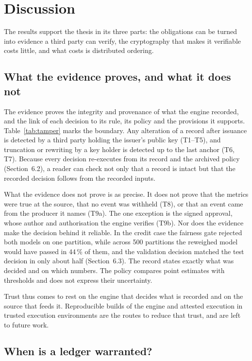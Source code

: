 \section{Discussion}
\label{sec:discussion}

The results support the thesis in its three parts: the obligations can be turned into evidence a third party can verify, the cryptography that makes it verifiable costs little, and what costs is distributed ordering.

\subsection{What the evidence proves, and what it does not}
\label{sec:disc-proves}

The evidence proves the integrity and provenance of what the engine recorded, and the link of each decision to its rule, its policy and the provisions it supports. Table~\ref{tab:tamper} marks the boundary. Any alteration of a record after issuance is detected by a third party holding the issuer's public key (T1--T5), and truncation or rewriting by a key holder is detected up to the last anchor (T6, T7). Because every decision re-executes from its record and the archived policy (Section~6.2), a reader can check not only that a record is intact but that the recorded decision follows from the recorded inputs.

What the evidence does not prove is as precise. It does not prove that the metrics were true at the source, that no event was withheld (T8), or that an event came from the producer it names (T9a). The one exception is the signed approval, whose author and authorisation the engine verifies (T9b). Nor does the evidence make the decision behind it reliable. In the credit case the fairness gate rejected both models on one partition, while across 500 partitions the reweighed model would have passed in 44\,\% of them, and the validation decision matched the test decision in only about half (Section~6.3). The record states exactly what was decided and on which numbers. The policy compares point estimates with thresholds and does not express their uncertainty.

Trust thus comes to rest on the engine that decides what is recorded and on the source that feeds it. Reproducible builds of the engine and attested execution in trusted execution environments are the routes to reduce that trust, and are left to future work.

\subsection{When is a ledger warranted?}
\label{sec:disc-ledger}

